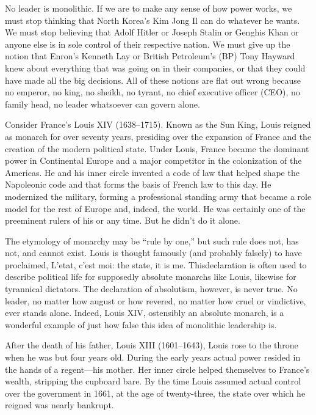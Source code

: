 \documentclass[10pt]{article}
\begin{document}
{\large No leader is monolithic. If we are to make any sense of how power works,
we must stop thinking that North Korea's Kim Jong Il can do whatever he wants. We
must stop believing that Adolf Hitler or Joseph Stalin or Genghis Khan or anyone
else is in sole control of their respective nation. We must give up the notion
that Enron's Kenneth Lay or British Petroleum's (BP) Tony Hayward knew about
everything that was going on in their companies, or that they could have made all
the big decisions. All of these notions are flat out wrong because no emperor, no
king, no sheikh, no tyrant, no chief executive officer (CEO), no family head, no
leader whatsoever can govern alone.}

{\large Consider France's Louis XIV (1638--1715). Known as the Sun King, Louis
reigned as monarch for over seventy years, presiding over the expansion of France
and the creation of the modern political state. Under Louis, France became the
dominant power in Continental Europe and a major competitor in the colonization
of the Americas. He and his inner circle invented a code of law that helped shape
the Napoleonic code and that forms the basis of French law to this day. He
modernized the military, forming a professional standing army that became a role
model for the rest of Europe and, indeed, the world. He was certainly one of the
preeminent rulers of his or any time. But he didn't do it alone.}

{\large The etymology of monarchy may be ``rule by one,'' but such rule does
not, has not, and cannot exist. Louis is thought famously (and probably falsely)
to have proclaimed, L'etat, c'est moi: the state, it is me. Thisdeclaration is
often used to describe political life for supposedly absolute monarchs like
Louis, likewise for tyrannical dictators. The declaration of absolutism, however,
is never true. No leader, no matter how august or how revered, no matter how
cruel or vindictive, ever stands alone. Indeed, Louis XIV, ostensibly an absolute
monarch, is a wonderful example of just how false this idea of monolithic
leadership is.}

{\large After the death of his father, Louis XIII (1601--1643), Louis rose to
the throne when he was but four years old. During the early years actual power
resided in the hands of a regent---his mother. Her inner circle helped themselves
to France's wealth, stripping the cupboard bare. By the time Louis assumed actual
control over the government in 1661, at the age of twenty-three, the state over
which he reigned was nearly bankrupt.}
\end{document}

